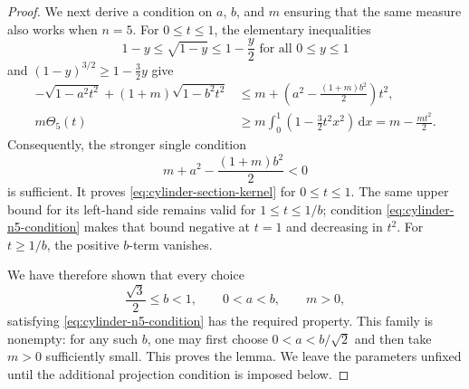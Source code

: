 \documentclass[10pt,a4paper]{amsart}
\newcommand{\dd}{\,\mathrm{d}}
\begin{document}
\begin{proof}
We next derive a condition on $a$, $b$, and $m$ ensuring that the same
measure also works when $n=5$.  For $0\leq t\leq1$, the elementary inequalities
\[
 1-y\leq\sqrt{1-y}\leq1-\frac y2
 \mbox{ for all } 0\leq y\leq1
\]
and $(1-y)^{3/2}\geq1-\frac32y$ give
\begin{align*}
 -\sqrt{1-a^2t^2}+(1+m)\sqrt{1-b^2t^2}
 &\leq m+
 \left(a^2-\frac{(1+m)b^2}{2}\right)t^2,\\
 m\Theta_5(t)
 &\geq m\int_0^1
 \left(1-\frac32t^2x^2\right)\dd x
 =m-\frac{mt^2}{2}.
\end{align*}
Consequently, the stronger single condition
\begin{equation}\label{eq:cylinder-n5-condition}
 m+a^2-\frac{(1+m)b^2}{2}<0
\end{equation}
is sufficient.  It proves
\eqref{eq:cylinder-section-kernel} for
$0\leq t\leq1$.  The same upper bound for its left-hand side remains valid
for $1\leq t\leq1/b$; condition
\eqref{eq:cylinder-n5-condition} makes that bound negative at $t=1$ and
decreasing in $t^2$.  For $t\geq1/b$, the positive $b$-term vanishes.

We have therefore shown that every choice
\[
 \frac{\sqrt3}{2}\leq b<1,\qquad 0<a<b,\qquad m>0,
\]
satisfying \eqref{eq:cylinder-n5-condition} has the required property.  This
family is nonempty: for any such $b$, one may first choose
$0<a<b/\sqrt2$ and then take $m>0$ sufficiently small.  This proves the
lemma.  We leave the parameters unfixed until the additional projection
condition is imposed below.
\end{proof}
\end{document}
